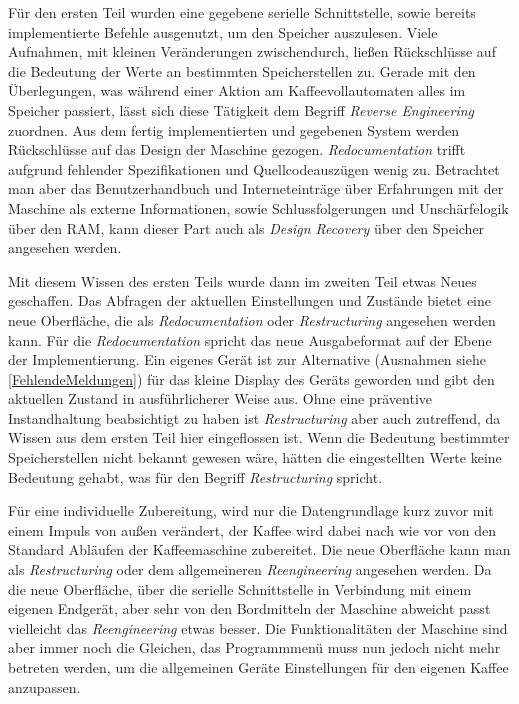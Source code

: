 Für den ersten Teil wurden eine gegebene serielle Schnittstelle, sowie bereits implementierte Befehle ausgenutzt, um den Speicher auszulesen.
Viele Aufnahmen, mit kleinen Veränderungen zwischendurch, ließen Rückschlüsse auf die Bedeutung der Werte an bestimmten Speicherstellen zu.
Gerade mit den Überlegungen, was während einer Aktion am Kaffeevollautomaten alles im Speicher passiert, lässt sich diese Tätigkeit dem Begriff \textit{Reverse Engineering} zuordnen.
Aus dem fertig implementierten und gegebenen System werden Rückschlüsse auf das Design der Maschine gezogen.
\textit{Redocumentation} trifft aufgrund fehlender Spezifikationen und Quellcodeauszügen wenig zu.
Betrachtet man aber das Benutzerhandbuch und Interneteinträge über Erfahrungen mit der Maschine als externe Informationen, sowie Schlussfolgerungen und Unschärfelogik über den \ac{RAM}, kann dieser Part auch als \textit{Design Recovery} über den Speicher angesehen werden.

Mit diesem Wissen des ersten Teils wurde dann im zweiten Teil etwas Neues geschaffen.
Das Abfragen der aktuellen Einstellungen und Zustände bietet eine neue Oberfläche, die als \textit{Redocumentation} oder \textit{Restructuring} angesehen werden kann.
Für die \textit{Redocumentation} spricht das neue Ausgabeformat auf der Ebene der Implementierung.
Ein eigenes Gerät ist zur Alternative (Ausnahmen siehe \ref{FehlendeMeldungen}) für das kleine Display des Geräts geworden und gibt den aktuellen Zustand in ausführlicherer Weise aus.
Ohne eine präventive Instandhaltung beabsichtigt zu haben ist \textit{Restructuring} aber auch zutreffend, da Wissen aus dem ersten Teil hier eingeflossen ist.
Wenn die Bedeutung bestimmter Speicherstellen nicht bekannt gewesen wäre, hätten die eingestellten Werte keine Bedeutung gehabt, was für den Begriff \textit{Restructuring} spricht.

Für eine individuelle Zubereitung, wird nur die Datengrundlage kurz zuvor mit einem Impuls von außen verändert, der Kaffee wird dabei nach wie vor von den Standard Abläufen der Kaffeemaschine zubereitet.
Die neue Oberfläche kann man als \textit{Restructuring} oder dem allgemeineren \textit{Reengineering} angesehen werden.
Da die neue Oberfläche, über die serielle Schnittstelle in Verbindung mit einem eigenen Endgerät, aber sehr von den Bordmitteln der Maschine abweicht passt vielleicht das \textit{Reengineering} etwas besser.
Die Funktionalitäten der Maschine sind aber immer noch die Gleichen, das Programmmenü muss nun jedoch nicht mehr betreten werden, um die allgemeinen Geräte Einstellungen für den eigenen Kaffee anzupassen.

